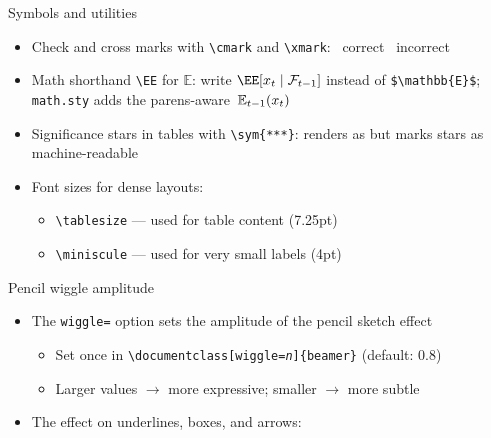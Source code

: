 \documentclass[10pt,itemsep]{beamer}
\begin{document}
\begin{frame}
    {Symbols and utilities}
    \begin{itemize}
        \item Check and cross marks with \texttt{\textbackslash cmark} and \texttt{\textbackslash xmark}: \quad \cmark\ correct \quad \xmark\ incorrect\bigskip
        \item Math shorthand \texttt{\textbackslash EE} for $\mathbb{E}$: write $\EE[x_t \mid \Fc_{t-1}]$ instead of \texttt{\$\textbackslash mathbb\{E\}\$}; \texttt{math.sty} adds the parens-aware $\E[t-1]{x_t}$\bigskip
        \item Significance stars in tables with \texttt{\textbackslash sym\{***\}}: renders as \sym{***} but marks stars as machine-readable\bigskip
        \item Font sizes for dense layouts:
        \begin{itemize}
            \item \texttt{\textbackslash tablesize} --- {\tablesize used for table content (7.25pt)}
            \item \texttt{\textbackslash miniscule} --- {\miniscule used for very small labels (4pt)}
        \end{itemize}
    \end{itemize}
\end{frame}
\shownotesblock{}

\begin{frame}
    {Pencil wiggle amplitude}
    \begin{itemize}
        \item The \texttt{wiggle=} option sets the amplitude of the pencil sketch effect
        \begin{itemize}
            \item Set once in \texttt{\textbackslash documentclass[wiggle=\textit{n}]\{beamer\}} (default: 0.8)
            \item Larger values $\rightarrow$ more expressive; smaller $\rightarrow$ more subtle
        \end{itemize}\bigskip
        \item The effect on underlines, boxes, and arrows:
    \end{itemize}
    \begin{center}
        \renewcommand{\jambrowiggleamp}{0.2pt}%
         \quad {} \quad
    \end{center}
    \begin{center}
        \renewcommand{\jambrowiggleamp}{0.8pt}%
         \quad {} \quad
    \end{center}
    \begin{center}
        \renewcommand{\jambrowiggleamp}{2.5pt}%
         \quad {} \quad
    \end{center}
\end{frame}
\shownotesblock{}
\end{document}
